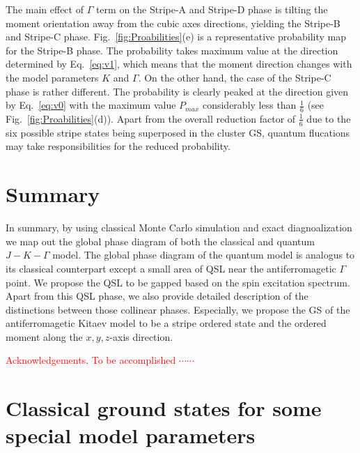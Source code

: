 \documentclass[aps,prb,reprint,amsfonts,amsmath,amssymb,showpacs,groupedaddress,superscriptaddress]{revtex4-1}
\begin{document}
The main effect of $\Gamma$ term on the Stripe-A and Stripe-D phase is tilting the moment orientation away from the cubic axes directions, yielding the Stripe-B and Stripe-C phase. Fig.~\ref{fig:Proabilities}(e) is a representative probability map for the Stripe-B phase. The probability takes maximum value at the direction determined by Eq.~\eqref{eq:v1}, which means that the moment direction changes with the model parameters $K$ and $\Gamma$. On the other hand, the case of the Stripe-C phase is rather different. The probability is clearly peaked at the direction given by Eq.~\eqref{eq:v0} with the maximum value $P_{max}$ considerably less than $\frac{1}{6}$ (see Fig.~\ref{fig:Proabilities}(d)). Apart from the overall reduction factor of $\frac{1}{6}$ due to the six possible stripe states being superposed in the cluster GS, quantum flucations may take responsibilities for the reduced probability.

\section{\label{sec:SectionVI}Summary}
In summary, by using classical Monte Carlo simulation and exact diagnoalization we map out the global phase diagram of both the classical and quantum $J-K-\Gamma$ model. The global phase diagram of the quantum model is analogus to its classical counterpart except a small area of QSL near the antiferromagetic $\Gamma$ point. We propose the QSL to be gapped based on the spin excitation spectrum. Apart from this QSL phase, we also provide detailed description of the distinctions between those collinear phases. Especially, we propose the GS of the antiferromagetic Kitaev model to be a stripe ordered state and the ordered moment along the $x, y, z$-axis direction.

\begin{acknowledgments}
    \textcolor{red}{Acknowledgements.  To be accomplished $\cdots \cdots$}
\end{acknowledgments}


\newpage
\appendix

\section{\label{apx:AppendixA}Classical ground states for some special model parameters}
\end{document}
